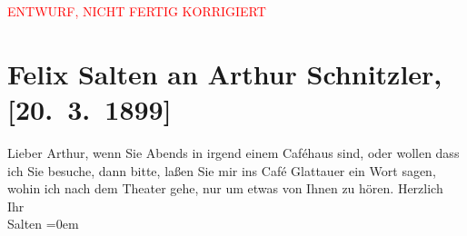 
\begin{center}
            \textcolor{red}{ENTWURF, NICHT FERTIG KORRIGIERT}
                      \end{center}
            
         \renewcommand{\erwaehnteOrte}{Orte: Café Glattauer, Wien}
         \renewcommand{\erwaehnteWerke}{}
               \section[Felix Salten an Arthur Schnitzler, {[}20. 3. 1899{]}]{ Felix Salten an Arthur Schnitzler, {[}20. 3. 1899{]}}\nopagebreak{}\rehead{ }\begin{ledgroupsized}[t]{13cm}\normalsize\beginnumbering \toendnotes[C]{\smallbreak\pagebreak[2]} 
\pstart
           \noindent{}{\pb}Lieber Arthur, wenn Sie Abends in irgend einem Caféhaus sind, oder
               wollen dass ich Sie besuche, dann bitte, laßen Sie mir ins Café Glattauer ein Wort sagen, wohin ich nach dem Theater
               gehe, nur um etwas von Ihnen zu hören.\pend
           \pstart
           Herzlich {\\[\baselineskip]}Ihr {\\[\baselineskip]}\spacefill\mbox{Salten}\pend
           \leftskip=0em{}
         
         \endnumbering{}\end{ledgroupsized}\begin{anhang}\end{anhang}\newcommand{\dateiname}{L03287}\newcommand{\titel}{Felix Salten an Arthur Schnitzler, [20. 3. 1899]}\newcommand{\editorInnen}{Martin Anton Müller und Laura Untner}
      